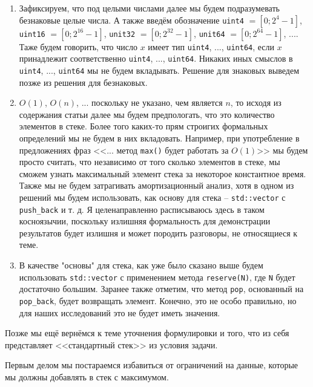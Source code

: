 \begin{enumerate}
    \item  Зафиксируем, что под целыми числами далее мы будем подразумевать безнаковые целые числа. А также введём обозначение \texttt{uint4} \(= [0; 2^4-1]\), \texttt{uint16} \(= [0; 2^{16}-1]\), \texttt{unit32} \( = [0;2^{32}-1]\), \texttt{unit64} \(= [0;2^{64} - 1]\), .... Таже будем говорить, что число \(x\) имеет тип \texttt{uint4}, ..., \texttt{uint64}, если \(x\) принадлежит соответственно \texttt{uint4}, ..., \texttt{uint64}. Никаких иных смыслов в \texttt{uint4}, ..., \texttt{uint64} мы не будем вкладывать. Решение для знаковых выведем позже из решения для безнаковых.
    \item  \(O(1)\), \(O(n)\), ... поскольку не указано, чем является \(n\), то исходя из содержания статьи далее мы будем предпологать, что это количество элементов в стеке. Более того каких-то прям строигих формальных определений мы не будем в них вкладовать. Например, при употребление в предложениях фраз <<... метод \texttt{max()} будет работать за \(O(1)\)>> мы будем просто считать, что независимо от того сколько элементов в стеке, мы сможем узнать максимальный элемент стека за некоторое константное время.
    Также мы не будем затрагивать амортизационный анализ, хотя в одном из решений мы будем использовать, как основу для стека -- \texttt{std::vector} с \texttt{push_back} и т. д. 
    Я целенаправленно расписываюсь здесь в таком косноязычии, поскольку излишняя формальность для демонстрации результатов будет излишня и может породить разговоры, не относящиеся к теме.  
    \item В качестве "основы" для стека, как уже было сказано выше будем использовать \texttt{std::vector} с применением метода \texttt{reserve(N)}, где \texttt{N} будет достаточно большим. Заранее также отметим, что метод \texttt{pop}, основанный на \texttt{pop_back}, будет возвращать элемент. Конечно, это не особо правильно, но для наших исследований это не будет иметь значения. 
\end{enumerate}
\begin{mdframed}[style=mdfStyleCode]%
    \begin{remark}\rm%
    Позже мы ещё вернёмся к теме уточнения формулировки и того, что из себя представляет <<стандартный стек>> из условия задачи.
\end{remark}
\end{mdframed}

Первым делом мы постараемся избавиться от ограничений на данные, которые мы должны добавлять в стек с максимумом. 

